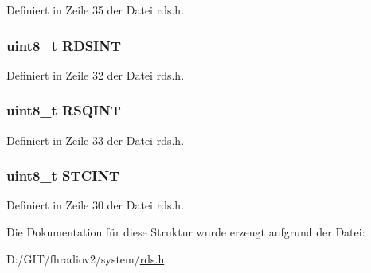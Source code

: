 Definiert in Zeile 35 der Datei rds.\+h.

\hypertarget{structstatus_a4fac7351844086822dbf634529f6cfbd}{}
\subsubsection[{R\+D\+S\+I\+N\+T}]{\setlength{\rightskip}{0pt plus 5cm}uint8\+\_\+t R\+D\+S\+I\+N\+T}\label{structstatus_a4fac7351844086822dbf634529f6cfbd}


Definiert in Zeile 32 der Datei rds.\+h.

\hypertarget{structstatus_a9637ec0bb6d40570ea68a1b96c5d561e}{}
\subsubsection[{R\+S\+Q\+I\+N\+T}]{\setlength{\rightskip}{0pt plus 5cm}uint8\+\_\+t R\+S\+Q\+I\+N\+T}\label{structstatus_a9637ec0bb6d40570ea68a1b96c5d561e}


Definiert in Zeile 33 der Datei rds.\+h.

\hypertarget{structstatus_a1026d3a63b328db2451abc49e0bd5a2c}{}
\subsubsection[{S\+T\+C\+I\+N\+T}]{\setlength{\rightskip}{0pt plus 5cm}uint8\+\_\+t S\+T\+C\+I\+N\+T}\label{structstatus_a1026d3a63b328db2451abc49e0bd5a2c}


Definiert in Zeile 30 der Datei rds.\+h.



Die Dokumentation für diese Struktur wurde erzeugt aufgrund der Datei\+:\begin{DoxyCompactItemize}
\item 
D\+:/\+G\+I\+T/fhradiov2/system/\hyperlink{rds_8h}{rds.\+h}\end{DoxyCompactItemize}
